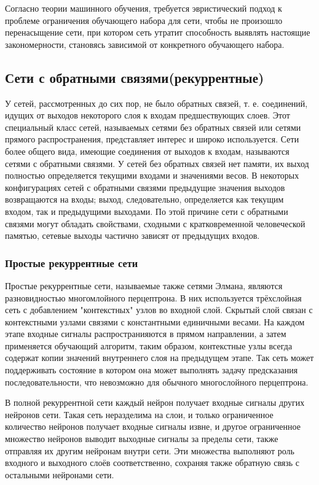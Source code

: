 \documentclass[a4paper,12pt]{report}
\begin{document}
Согласно теории машинного обучения, требуется эвристический подход к проблеме ограничения обучающего набора для сети, чтобы не произошло перенасыщение сети, при котором сеть утратит способность выявлять настоящие закономерности, становясь зависимой от конкретного обучающего набора. 

\subsection{Сети с обратными связями(рекуррентные)}
У сетей, рассмотренных до сих пор, не было обратных связей, т. е. соединений, идущих от выходов некоторого слоя к входам предшествующих слоев. Этот специальный класс сетей, называемых сетями без обратных связей или сетями прямого распространения, представляет интерес и широко используется. Сети более общего вида, имеющие соединения от выходов к входам, называются сетями с обратными связями. У сетей без обратных связей нет памяти, их выход полностью определяется текущими входами и значениями весов. В некоторых конфигурациях сетей с обратными связями предыдущие значения выходов возвращаются на входы; выход, следовательно, определяется как текущим входом, так и предыдущими выходами. По этой причине сети с обратными связями могут обладать свойствами, сходными с кратковременной человеческой памятью, сетевые выходы частично зависят от предыдущих входов. 

\subsubsection{Простые рекуррентные сети}
Простые рекуррентные сети, называемые также сетями Элмана, являются разновидностью многомлойного перцептрона. В них используется трёхслойная сеть с добавлением "контекстных" узлов во входной слой. Скрытый слой связан с контекстными узлами связями с константными единичными весами. На каждом этапе входные сигналы распространияются в прямом направлении, а затем применяется обучающий алгоритм, таким образом, контекстные узлы всегда содержат копии значений внутреннего слоя на предыдущем этапе. Так сеть может поддерживать состояние в котором она может выполнять задачу предсказания последовательности, что невозможно для обычного многослойного перцептрона. 

В полной рекуррентной сети каждый нейрон получает входные сигналы других нейронов сети. Такая сеть неразделима на слои, и только ограниченное количество нейронов получает входные сигналы извне, и другое ограниченное множество нейронов выводит выходные сигналы за пределы сети, также отправляя их другим нейронам внутри сети. Эти множества выполняют роль входного и выходного слоёв соответственно, сохраняя также обратную связь с остальными нейронами сети.
\end{document}
